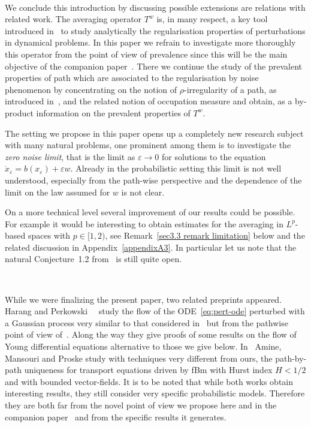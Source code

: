 \documentclass[10pt]{article}
\newcommand{\tmtextit}[1]{{\itshape{#1}}}
\begin{document}
\

We conclude this introduction by discussing possible extensions are relations
with related work. The averaging operator $T^w$ is, in many respect, a key
tool introduced in~{\cite{catelliergubinelli}} to study analytically the
regularisation properties of perturbations in dynamical problems. In this
paper we refrain to investigate more thoroughly this operator from the point
of view of prevalence since this will be the main objective of the companion
paper~{\cite{galeatigubinelli}}. There we continue the study of the prevalent
properties of path which are associated to the regularisation by noise
phenomenon by concentrating on the notion of $\rho$\mbox{-}irregularity of a
path, as introduced in~{\cite{catelliergubinelli}}, and the related notion of
occupation measure and obtain, as a by-product information on the prevalent
properties of $T^w$.

The setting we propose in this paper opens up a completely new research
subject with many natural problems, one prominent among them is to investigate
the \tmtextit{zero noise limit}, that is the limit as $\varepsilon \rightarrow
0$ for solutions to the equation $\dot{x}_{\varepsilon} = b (x_{\varepsilon})
+ \varepsilon w$. Already in the probabilistic setting this limit is not well
understood, especially from the path-wise perspective and the dependence of
the limit on the law assumed for $w$ is not clear.

On a more technical level several improvement of our results could be
possible. For example it would be interesting to obtain estimates for the
averaging in $L^p$\mbox{-}based spaces with $p \in [1, 2)$, see
Remark~\ref{sec3.3 remark limitation} below and the related discussion in
Appendix~\ref{appendixA3}. In particular let us note that the natural
Conjecture~1.2 from~{\cite{catelliergubinelli}} is still quite open.

\

While we were finalizing the present paper, two related preprints appeared.
Harang and Perkowski~{\cite{perkowski}} \ study the flow of the
ODE~{\eqref{eq:pert-ode}} perturbed with a Gaussian process very similar to
that considered in~{\cite{banosproske}} but from the pathwise point of view
of~{\cite{catelliergubinelli}}. Along the way they give proofs of some results
on the flow of Young differential equations alternative to those we give
below. In~{\cite{amine2020}} Amine, Mansouri and Proske study with techniques
very different from ours, the path-by-path uniqueness for transport equations
driven by fBm with Hurst index $H < 1 / 2$ and with bounded vector-fields. It
is to be noted that while both works obtain interesting results, they still
consider very specific probabilistic models. Therefore they are both far from
the novel point of view we propose here and in the companion
paper~{\cite{galeatigubinelli}} and from the specific results it generates.
\end{document}
